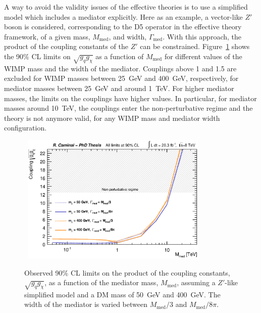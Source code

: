 A way to avoid the validity issues of the effective theories is to use a simplified model which includes a mediator explicitly.
Here as an example, a vector-like $Z'$ boson is considered, corresponding to the D5 operator in the effective theory framework, of a given mass, $M_{\text{med}}$, and width, $\Gamma_{\text{med}}$.
With this approach, the product of the coupling constants of the $Z'$ can be constrained.
Figure~\ref{fig:WIMPsSimplifiedCouplingLimit} shows the 90\% CL limits on $\sqrt{g_{q}g_{\chi}}$ as a function of $M_{\text{med}}$ for different values of the WIMP mass and the width of the mediator.
Couplings above 1 and 1.5 are excluded for WIMP masses between 25~GeV and 400~GeV, respectively, for mediator masses between 25~GeV and around 1~TeV.
For higher mediator masses, the limits on the couplings have higher values.
In particular, for mediator masses around 10~TeV, the couplings enter the non-perturbative regime and the theory is not anymore valid, for any WIMP mass and mediator width configuration.

\begin{figure}[!t]
  \begin{center}
    \mbox{
      \includegraphics[width=0.795\textwidth]{Interpretations/Figures/WIMPsimplified_MmedCoupling.eps}
    }
  \end{center}
  \caption[Observed 90\% CL limits on the product of the coupling constants as a function of the mediator mass, assuming a $Z'$-like simplified model.]{Observed 90\% CL limits on the product of the coupling constants, $\sqrt{g_q g_\chi}$, as a function of the mediator mass, $M_\text{med}$, assuming a $Z'$-like simplified model and a DM mass of 50~GeV and 400~GeV. The width of the mediator is varied between $M_\text{med}/3$ and $M_\text{med}/8\pi$.}
  \label{fig:WIMPsSimplifiedCouplingLimit}
\end{figure}

